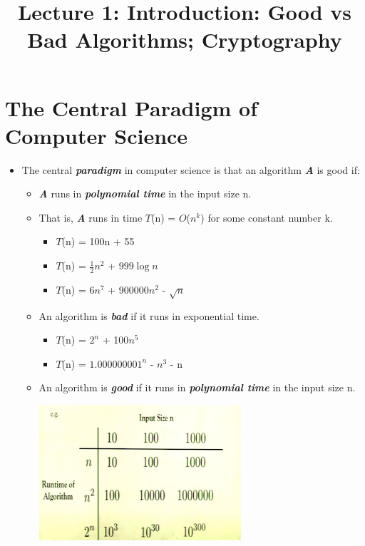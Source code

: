 \documentclass[12pt]{article}
\title{\huge Lecture 1: Introduction: Good vs Bad Algorithms; Cryptography}
\author{}
\date{}
\begin{document}
\maketitle


\section{The Central Paradigm of Computer Science}
\renewcommand{\labelitemii}{$\circ$}
\renewcommand{\labelitemiii}{$\cdot$}
\begin{itemize}
\item The central \textbf{\textit{paradigm}}  in computer science is that an algorithm \textbf{\textit{A}} is good if:
	\begin{itemize}
	\item \textbf{\textit{A}} runs in \textbf{\textit{polynomial time}} in the input size n.
	\item That is, \textbf{\textit{A}} runs in time $T$(n) = $O$($n^k$) for some constant number k.
		\begin{itemize}
		\item $T$(n) = 100n + 55
		\item $T$(n) = \( \frac{1}{2} \)$n^2$ + $999\log{}n$
		\item $T$(n) = 6$n^7$ + 900000$n^2$ - $\sqrt{n}$			
		\end{itemize}
	\item An algorithm is \textbf{\textit{bad}} if it runs in exponential time.
		\begin{itemize}
		\item $T$(n) = $2^n$ + 100$n^5$
		\item $T$(n) = $1.000000001^n$ - $n^3$ - n 
		\end{itemize}	
	\item An algorithm is \textbf{\textit{good}} if it runs in \textbf{\textit{polynomial time}} in the input size n.
	\begin{center}
	\includegraphics{lecture1a}
	\end{center}
	\end{itemize}
\end{itemize}
\end{document}
